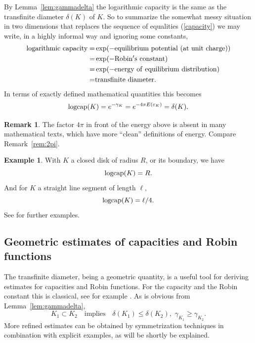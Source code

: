 \documentclass[reqno,12pt]{article}
\theoremstyle{plain}
\theoremstyle{definition}
\newtheorem{remark}[defn]{Remark}
\newtheorem{example}[defn]{Example}
\numberwithin{equation}{section}
\numberwithin{figure}{section}
\begin{document}
By Lemma~\ref{lem:gammadelta} the logarithmic capacity is the same as the {transfinite diameter} $\delta(K)$ of $K$.
So to summarize the somewhat messy situation in two dimensions that replaces the sequence of equalities
(\ref{capacity}) we may write, in a highly informal way and ignoring some constants,
\begin{align*}
{\rm logarithmic\,\, capacity}=& \exp({-{\rm equilibrium\,\,potential \,\,(at \,\,unit \,\,charge)}})\\
=&\exp(-{\rm Robin's \,\,constant})\\
=&\exp({-{\rm energy \,\, of \,\, equilibrium\,\, distribution}})\\
=&{\rm transfinite \,\,diameter}.
\end{align*}
In terms of exactly defined mathematical quantities this becomes 
$$
{\rm logcap}(K)=e^{-\gamma_K}= e^{-4\pi E(\varepsilon_K)}=\delta(K).
$$

\begin{remark}
The factor $4\pi$ in front of the energy above is absent in many mathematical texts, which have more ``clean'' definitions 
of energy. Compare Remark~\ref{rem:2pi}.
\end{remark}

\begin{example}
With $K$ a closed disk of radius $R$, or its boundary, we have
$$
{\rm logcap}(K)=R.
$$
And for $K$ a straight line segment of length $\ell$, 
$$
{\rm logcap}(K)=\ell/4.
$$
See \cite{Ransford-1995} for further examples.
\end{example}


\subsection{Geometric estimates of capacities and Robin functions}\label{sec:estimates}

The transfinite diameter, being a geometric quantity, is a useful tool for deriving estimates for capacities and Robin functions.
For the capacity and the Robin constant this is classical, see for example \cite{Ahlfors-1973, Ransford-1995}. As is obvious 
from Lemma~\ref{lem:gammadelta},
\begin{equation}
K_1\subset K_2\quad\text{implies}\quad\delta (K_1)\leq \delta (K_2), \,\, \gamma_{K_1}\geq \gamma_{K_2}.
\end{equation}
More refined estimates can be obtained by symmetrization techniques in combination with explicit examples,
as will be shortly be explained.
\end{document}
